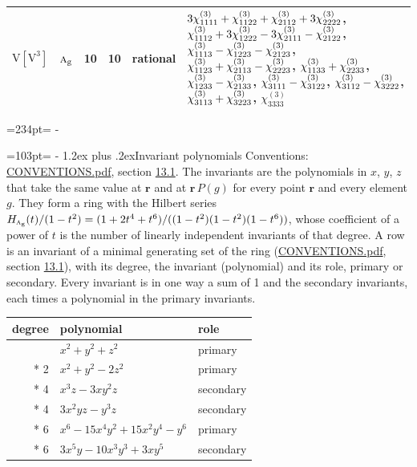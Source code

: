 \documentclass[10pt,a4paper]{article}
\makeatletter
\renewcommand\section{\@startsection{section}{1}{\z@}{-3ex plus -1ex minus -.2ex}%
  {1.2ex plus .2ex}{\normalfont\large\sffamily\bfseries\color{parttitle}}}
\newcommand{\needspace}[1]{\par\penalty-100\begingroup\dimen0=#1\relax\dimen2=\pagegoal
  \advance\dimen2-\pagetotal\ifdim\dimen0>\dimen2\relax\ifdim\dimen2>0pt\vfil\break\fi\fi
  \endgroup}
\numberwithin{equation}{section}
\newcommand{\irr}[1]{\text{\normalfont\scshape #1}}
\newcommand{\ptag}[1]{\mathrm{#1}}
\newcommand{\pointr}{\mathbf{r}}
\newcommand{\jahn}[1]{\mathrm{#1}}
\newlength{\fillwidth}\newlength{\cellwidth}\newlength{\colwidth}
\newcommand{\signbreak}{\penalty100\relax}
\makeatother
\begin{document}
{\begin{longtable}{@{}llrrl>{\RaggedRight\arraybackslash}p{\fillwidth}@{}}
$\jahn{V[V^{3}]}$ & $\irr{a}_{\ptag{g}}$ & 10 & 10 & rational & $3\chi^{(3)}_{1111} +\signbreak \chi^{(3)}_{1122} +\signbreak \chi^{(3)}_{2112} +\signbreak 3\chi^{(3)}_{2222}$, $\chi^{(3)}_{1112} +\signbreak 3\chi^{(3)}_{1222} -\signbreak 3\chi^{(3)}_{2111} -\signbreak \chi^{(3)}_{2122}$, $\chi^{(3)}_{1113} -\signbreak \chi^{(3)}_{1223} -\signbreak \chi^{(3)}_{2123}$, $\chi^{(3)}_{1123} +\signbreak \chi^{(3)}_{2113} -\signbreak \chi^{(3)}_{2223}$, $\chi^{(3)}_{1133} +\signbreak \chi^{(3)}_{2233}$, $\chi^{(3)}_{1233} -\signbreak \chi^{(3)}_{2133}$, $\chi^{(3)}_{3111} -\signbreak \chi^{(3)}_{3122}$, $\chi^{(3)}_{3112} -\signbreak \chi^{(3)}_{3222}$, $\chi^{(3)}_{3113} +\signbreak \chi^{(3)}_{3223}$, $\chi^{(3)}_{3333}$\\
\bottomrule\end{longtable}}
\needspace{234pt}
\needspace{103pt}
\section{Invariant polynomials}\label{s:invariant_polynomials}
Conventions: \href{../../CONVENTIONS.pdf}{CONVENTIONS.pdf}, section \href{../../CONVENTIONS.pdf\#conv.13.1}{13.1}.
The invariants are the polynomials in $x$, $y$, $z$ that take the same value at $\pointr$ and at $\pointr\,P(g)$ for every point $\pointr$ and every element $g$. They form a ring with the Hilbert series $H_{\irr{a}_{\ptag{g}}}(t)/(1-t^{2}) = (1 + 2t^{4} + t^{6})/((1-t^{2})(1-t^{2})(1-t^{6}))$, whose coefficient of a power of $t$ is the number of linearly independent invariants of that degree. \label{n:head.degree}\label{n:head.role}A row is an invariant of a minimal generating set of the ring (\href{../../CONVENTIONS.pdf}{CONVENTIONS.pdf}, section \href{../../CONVENTIONS.pdf\#conv.13.1}{13.1}), with its degree, the invariant (polynomial) and its role, primary or secondary. Every invariant is in one way a sum of 1 and the secondary invariants, each times a polynomial in the primary invariants.
{\small\begin{longtable}{@{}rll@{}}\toprule
degree & polynomial & role\\\midrule\endhead
\bottomrule\endfoot\endlastfoot
2 & $x^{2} + y^{2} + z^{2}$ & primary\\*
2 & $x^{2} + y^{2} - 2z^{2}$ & primary\\*
4 & $x^{3}z - 3xy^{2}z$ & secondary\\*
4 & $3x^{2}yz - y^{3}z$ & secondary\\*
6 & $x^{6} - 15x^{4}y^{2} + 15x^{2}y^{4} - y^{6}$ & primary\\*
6 & $3x^{5}y - 10x^{3}y^{3} + 3xy^{5}$ & secondary\\
\bottomrule\end{longtable}}
\end{document}
